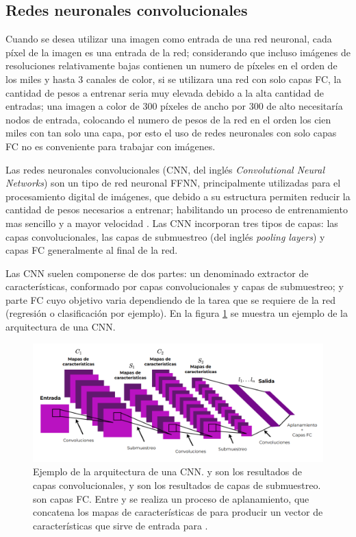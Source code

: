 \subsection{Redes neuronales convolucionales}

Cuando se desea utilizar una imagen como entrada de una red neuronal, cada píxel de la imagen es una entrada de la red; considerando que incluso imágenes de resoluciones relativamente bajas contienen un numero de píxeles en el orden de los miles y hasta 3 canales de color, si se utilizara una red con solo capas FC, la cantidad de pesos a entrenar seria muy elevada debido a la alta cantidad de entradas; una imagen a color de 300 píxeles de ancho por 300 de alto necesitaría  nodos de entrada, colocando el numero de pesos de la red en el orden los cien miles con tan solo una capa, por esto el uso de redes neuronales con solo capas FC no es conveniente para trabajar con imágenes.

Las redes neuronales convolucionales (CNN, del inglés \textit{Convolutional Neural Networks}) son un tipo de red neuronal FFNN, principalmente utilizadas para el procesamiento digital de imágenes, que debido a su estructura permiten reducir la cantidad de pesos necesarios a entrenar; habilitando un proceso de entrenamiento mas sencillo y a mayor velocidad \cite{Lecun2010}. Las CNN incorporan tres tipos de capas: las capas convolucionales, las capas de submuestreo (del inglés \textit{pooling layers}) y capas FC generalmente al final de la red.

Las CNN suelen componerse de dos partes: un denominado extractor de características, conformado por capas convolucionales y capas de submuestreo; y parte FC cuyo objetivo varia dependiendo de la tarea que se requiere de la red (regresión o clasificación por ejemplo). En la figura \ref{fig:cnn-sample} se muestra un ejemplo de la arquitectura de una CNN.

\begin{figure}[H]
    \centering
    \includegraphics[scale=0.35]{partes/ImgJoao/CNN-sample.png}
    \caption[Ejemplo de la arquitectura de una CNN.]{
        Ejemplo de la arquitectura de una CNN\footnotemark.  y  son los resultados de capas convolucionales,  y  son los resultados de capas de submuestreo.  son  capas FC. Entre  y  se realiza un proceso de aplanamiento, que concatena los mapas de características de  para producir un vector de características que sirve de entrada para .
    } 
    \label{fig:cnn-sample}
\end{figure}

